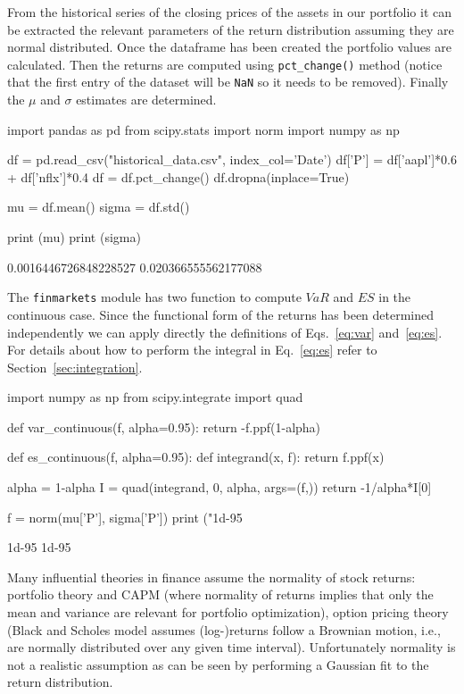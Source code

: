 From the historical series of the closing prices of the assets in our portfolio it can be extracted the relevant parameters of the return distribution assuming they are normal distributed.
Once the dataframe has been created the portfolio values are calculated. Then the returns are computed using \texttt{pct\_change()} method (notice that the first entry of the dataset will be \texttt{NaN} so it needs to be removed).
Finally the $\mu$ and $\sigma$ estimates are determined.

\begin{ipython}
import pandas as pd
from scipy.stats import norm
import numpy as np

df = pd.read_csv("historical_data.csv", index_col='Date')
df['P'] = df['aapl']*0.6 + df['nflx']*0.4
df = df.pct_change()
df.dropna(inplace=True)

mu = df.mean() 
sigma = df.std()

print (mu)
print (sigma)
\end{ipython}
\begin{ioutput}
0.0016446726848228527
0.020366555562177088
\end{ioutput}
\noindent
\begin{finmarkets}
The \texttt{finmarkets} module has two function to compute $VaR$ and $ES$ in the continuous case.
Since the functional form of the returns has been determined independently we can apply directly the definitions of  Eqs.~\ref{eq:var} and~\ref{eq:es}. 
For details about how to perform the integral in Eq.~\ref{eq:es} refer to Section~\ref{sec:integration}.
\end{finmarkets}

\begin{ipython}
import numpy as np
from scipy.integrate import quad

def var_continuous(f, alpha=0.95):
    return -f.ppf(1-alpha)

def es_continuous(f, alpha=0.95):
  def integrand(x, f):
    return f.ppf(x)

  alpha = 1-alpha
  I = quad(integrand, 0, alpha, args=(f,))
  return -1/alpha*I[0]
    
f = norm(mu['P'], sigma['P'])
print ("1d-95%
\end{ipython}
\begin{ioutput}
1d-95%
1d-95%
\end{ioutput}

Many influential theories in finance assume the normality of stock returns: portfolio theory and CAPM (where normality of returns implies that
only the mean and variance are relevant for portfolio optimization), option pricing theory (Black and Scholes model assumes (log-)returns follow a Brownian motion, i.e., are normally distributed over any given time interval).
Unfortunately normality is not a realistic assumption as can be seen by performing a Gaussian fit to the return distribution.

